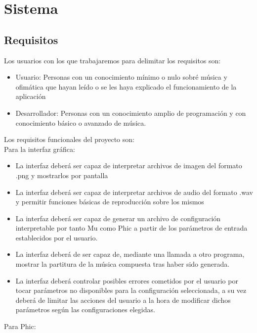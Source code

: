 \chapter{Sistema}


\section{Requisitos}
Los usuarios con los que trabajaremos para delimitar los requisitos son:
\begin{itemize}
	\item Usuario: Personas con un conocimiento mínimo o nulo sobré música y ofimática que hayan leído o se les haya explicado el funcionamiento de la aplicación
	\item Desarrollador: Personas con un conocimiento amplio de programación y con conocimiento básico o avanzado de música.
\end{itemize}
Los requisitos funcionales del proyecto son:
\\Para la interfaz gráfica:
 \begin{itemize}
	 \item La interfaz deberá ser capaz de interpretar archivos de imagen del formato .png y mostrarlos por pantalla
	 \item La interfaz deberá ser capaz de interpretar archivos de audio del formato .wav y permitir funciones básicas de reproducción sobre los mismos
	 \item La interfaz deberá ser capaz de generar un archivo de configuración interpretable por tanto Mu como Phic a partir de los parámetros de entrada establecidos por el usuario.
	 \item La interfaz deberá de ser capaz de, mediante una llamada a otro programa, mostrar la partitura de la música compuesta tras haber sido generada.
	 \item La interfaz deberá controlar posibles errores cometidos por el usuario por tocar parámetros no disponibles para la configuración seleccionada, a su vez deberá de limitar las acciones del usuario a la hora de modificar dichos parámetros según las configuraciones elegidas.
 \end{itemize}
 Para Phic:
